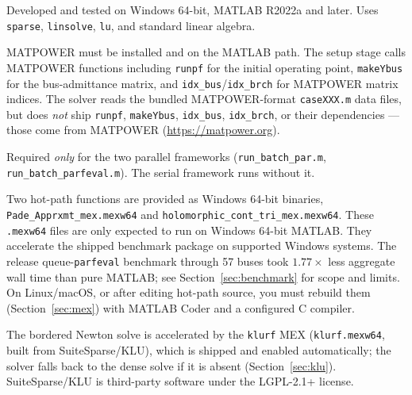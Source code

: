 \documentclass[11pt,a4paper]{article}
\newcommand{\code}[1]{\texttt{#1}}
\begin{document}
\begin{description}[leftmargin=0em,style=nextline]
\item[MATLAB (required).] Developed and tested on Windows 64-bit, MATLAB R2022a and
      later. Uses \code{sparse}, \code{linsolve}, \code{lu}, and standard linear algebra.
\item[MATPOWER (required).] MATPOWER must be installed and on the MATLAB path. The setup
      stage calls MATPOWER functions including \code{runpf} for the initial operating
      point, \code{makeYbus} for the bus-admittance matrix, and
      \code{idx_bus}/\code{idx_brch} for MATPOWER matrix indices. The solver reads the
      bundled MATPOWER-format \code{caseXXX.m} data files, but does \emph{not} ship
      \code{runpf}, \code{makeYbus}, \code{idx_bus}, \code{idx_brch}, or their
      dependencies --- those come from MATPOWER (\url{https://matpower.org}).
\item[Parallel Computing Toolbox (optional).] Required \emph{only} for the two parallel
      frameworks (\code{run_batch_par.m}, \code{run_batch_parfeval.m}). The serial
      framework runs without it.
\item[Compiled MEX (shipped).] Two hot-path functions are provided as Windows 64-bit
      binaries, \code{Pade_Apprxmt_mex.mexw64} and \code{holomorphic_cont_tri_mex.mexw64}.
      These \code{.mexw64} files are only expected to run on Windows 64-bit MATLAB. They
      accelerate the shipped benchmark package on supported Windows systems. The release
      queue-\code{parfeval} benchmark through 57 buses took $1.77\times$ less aggregate
      wall time than pure MATLAB; see Section~\ref{sec:benchmark} for scope and limits.
      On Linux/macOS, or after editing hot-path source, you must
      rebuild them (Section~\ref{sec:mex}) with MATLAB Coder and a configured C compiler.
\item[KLU acceleration (shipped).] The bordered Newton solve is accelerated by the
      \code{klurf} MEX (\code{klurf.mexw64}, built from SuiteSparse/KLU), which is shipped and
      enabled automatically; the solver falls back to the dense solve if it is absent
      (Section~\ref{sec:klu}). SuiteSparse/KLU is third-party software under the LGPL-2.1+
      license.
\end{description}
\end{document}
